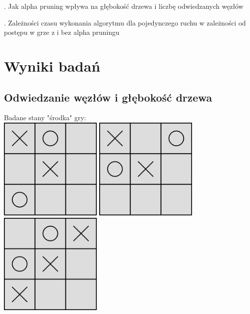 \documentclass{article}
\begin{document}
. Jak alpha pruning wpływa na głębokość drzewa i liczbę odwiedzanych węzłów

. Zależności czasu wykonania algorytmu dla pojedynczego ruchu w zależności od postępu w grze z i bez alpha pruningu

\section{Wyniki badań}

\subsection{Odwiedzanie węzłów i głębokość drzewa}

Badane stany "środka" gry:\\

\includegraphics[width=5cm, height=5cm]{midgamestate1.png}
\includegraphics[width=5cm, height=5cm]{midgamestate2.png}
\includegraphics[width=5cm, height=5cm]{midgamestate3.png}
\end{document}
